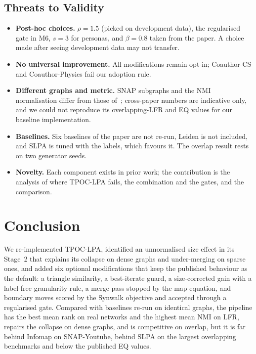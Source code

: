 \documentclass[conference]{IEEEtran}
\begin{document}
\subsection{Threats to Validity}\label{sec:limits}
\begin{itemize}
\item \textbf{Post-hoc choices.} $\rho=1.5$ (picked on development data), the regularised gate in M6, $s=3$ for personas, and $\beta=0.8$ taken from the paper. A choice made after seeing development data may not transfer.
\item \textbf{No universal improvement.} All modifications remain opt-in; Coauthor-CS and Coauthor-Physics fail our adoption rule.
\item \textbf{Different graphs and metric.} SNAP subgraphs and the NMI normalisation differ from those of~\cite{kong2026}; cross-paper numbers are indicative only, and we could not reproduce its overlapping-LFR and EQ values for our baseline implementation.
\item \textbf{Baselines.} Six baselines of the paper are not re-run, Leiden is not included, and SLPA is tuned with the labels, which favours it. The overlap result rests on two generator seeds.
\item \textbf{Novelty.} Each component exists in prior work; the contribution is the analysis of where TPOC-LPA fails, the combination and the gates, and the comparison.
\end{itemize}

\section{Conclusion}
We re-implemented TPOC-LPA, identified an unnormalised size effect in its Stage~2 that explains its collapse on dense graphs and under-merging on sparse ones, and added six optional modifications that keep the published behaviour as the default: a triangle similarity, a best-iterate guard, a size-corrected gain with a label-free granularity rule, a merge pass stopped by the map equation, and boundary moves scored by the Synwalk objective and accepted through a regularised gate. Compared with baselines re-run on identical graphs, the pipeline has the best mean rank on real networks and the highest mean NMI on LFR, repairs the collapse on dense graphs, and is competitive on overlap, but it is far behind Infomap on SNAP-Youtube, behind SLPA on the largest overlapping benchmarks and below the published EQ values.
\end{document}
